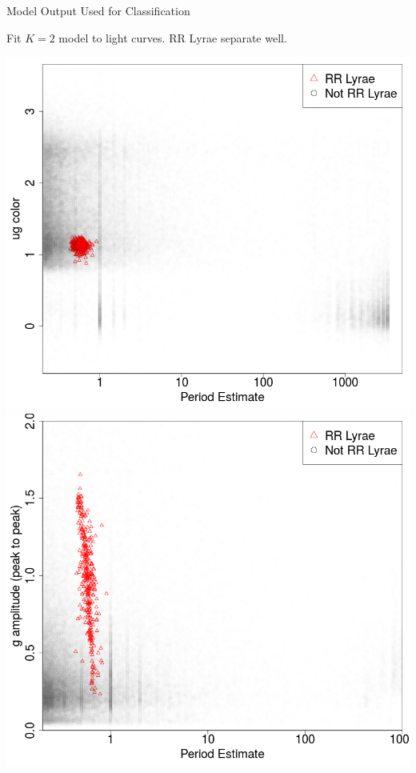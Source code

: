 \documentclass[12pt]{beamer}
\begin{document}
\begin{frame}{Model Output Used for Classification}

  \begin{center}
    Fit $K=2$ model to light curves. RR Lyrae separate well.
  \end{center}
  
\begin{center}
  \includegraphics[scale=.2]{figs/sdss_color_period.png}
  \includegraphics[scale=.2]{figs/sdss_gamp_period.png}
\end{center}



\end{frame}
\end{document}
